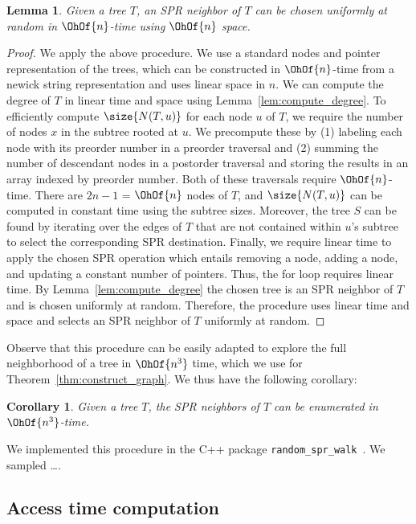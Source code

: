 \documentclass[11pt,onecolumn,conference]{IEEEtran}
\newtheorem{lemma}[theorem]{Lemma}
\newtheorem{corollary}[theorem]{Corollary}
\begin{document}
\begin{lemma}
	\label{lem:select_random_neighbor}
	Given a tree $T$, an SPR neighbor of $T$ can be chosen uniformly at random in $\OhOf{n}$-time using $\OhOf{n}$ space.
\end{lemma}
\begin{proof}
	We apply the above procedure.
	We use a standard nodes and pointer representation of the trees, which can be constructed in $\OhOf{n}$-time from a newick string representation and uses linear space in $n$.
	We can compute the degree of $T$ in linear time and space using Lemma~\ref{lem:compute_degree}.
	To efficiently compute $\size{N(T,u)}$ for each node $u$ of $T$, we require the number of nodes $x$ in the subtree rooted at $u$.
	We precompute these by (1) labeling each node with its preorder number in a preorder traversal and (2) summing the number of descendant nodes in a postorder traversal and storing the results in an array indexed by preorder number.
	Both of these traversals require $\OhOf{n}$-time.
	There are $2n-1$ = $\OhOf{n}$ nodes of $T$, and $\size{N(T,u)}$ can be computed in constant time using the subtree sizes.
	Moreover, the tree $S$ can be found by iterating over the edges of $T$ that are not contained within $u$'s subtree to select the corresponding SPR destination.
	Finally, we require linear time to apply the chosen SPR operation which entails removing a node, adding a node, and updating a constant number of pointers.
	Thus, the for loop requires linear time.
	By Lemma~\ref{lem:compute_degree} the chosen tree is an SPR neighbor of $T$ and is chosen uniformly at random.
	Therefore, the procedure uses linear time and space and selects an SPR neighbor of $T$ uniformly at random.
\end{proof}

Observe that this procedure can be easily adapted to explore the full neighborhood of a tree in $\OhOf{n^3}$ time, which we use for Theorem~\ref{thm:construct_graph}.
We thus have the following corollary:

\begin{corollary}
	Given a tree $T$, the SPR neighbors of $T$ can be enumerated in $\OhOf{n^3}$-time.
\end{corollary}

We implemented this procedure in the C++ package \texttt{random\_spr\_walk}~\cite{random_spr_walk}.
We sampled \ldots {}.

\cite{GAP4}

\subsection{Access time computation}
\end{document}
